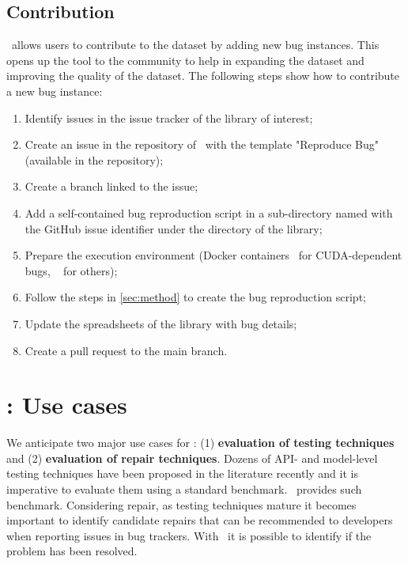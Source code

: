 \documentclass[sigconf,screen]{acmart}
\begin{document}
\subsection{Contribution}

\tname\ allows users to contribute to the dataset by adding new bug
instances. This opens up the tool to the community to help in
expanding the dataset and improving the quality of the dataset.
The following steps show how to contribute a new bug
instance:

\begin{enumerate}[leftmargin=0.5cm]
  \item Identify issues in the issue tracker of the library of interest;
  \item Create an issue in the repository of \tname\ with the template
    "Reproduce Bug" (available in the repository);
  \item Create a branch linked to the issue;
  \item Add a self-contained bug reproduction script in a sub-directory
    named with the GitHub issue identifier under the directory of the library;
  \item Prepare the execution environment (Docker containers~\cite{merkel2014docker} for CUDA-dependent
    bugs, ~\cite{venv} for others);
  \item Follow the steps in \ref{sec:method} to create the bug reproduction script;
  \item Update the spreadsheets of the library with bug details;
  \item Create a pull request to the main branch.
\end{enumerate}


\section{\tname: Use cases}

We anticipate two major use cases for \tname: (1) \textbf{evaluation
  of testing techniques} and (2) \textbf{evaluation of repair
  techniques}. Dozens of API- and model-level testing techniques have
been proposed in the literature recently and it is imperative to
evaluate them using a standard benchmark. \tname\ provides such
benchmark. Considering repair, as testing techniques mature it becomes
important to identify candidate repairs that can be recommended to
developers when reporting issues in bug trackers. With \tname\ it is
possible to identify if the problem has been resolved. 
\end{document}
